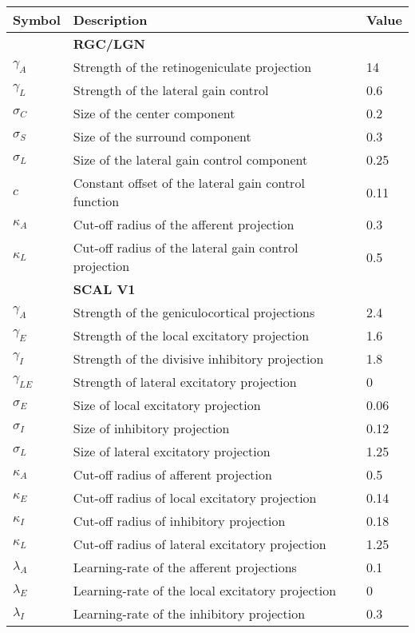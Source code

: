 {\renewcommand{\arraystretch}{0.7}
\begin{tabular}{ l l l }
  \hline
	Symbol & Description & Value \\ \hline
	\ & \textbf{RGC/LGN}  & \  \\
	$\gamma_A$ & Strength of the retinogeniculate projection & 14 \\
	$\gamma_L$ & Strength of the lateral gain control & 0.6 \\
	$\sigma_C$ & Size of the center component & 0.2 \\
	$\sigma_S$ & Size of the surround component & 0.3 \\
	$\sigma_L$ & Size of the lateral gain control component & 0.25 \\
	$c$ & Constant offset of the lateral gain control function & 0.11 \\
	$\kappa_A$ & Cut-off radius of the afferent projection & 0.3 \\
	$\kappa_L$ & Cut-off radius of the lateral gain control projection & 0.5 \\
	\ & \textbf{SCAL V1}  & \  \\
	$\gamma_A$ & Strength of the geniculocortical projections & 2.4 \\
	$\gamma_E$ & Strength of the local excitatory projection & 1.6 \\
	$\gamma_I$ & Strength of the divisive inhibitory projection & 1.8 \\
	$\gamma_{LE}$ & Strength of lateral excitatory projection & 0 \\
	$\sigma_E$ & Size of local excitatory projection & 0.06 \\
	$\sigma_I$ & Size of inhibitory projection & 0.12 \\
	$\sigma_L$ & Size of lateral excitatory projection & 1.25 \\
	$\kappa_A$ & Cut-off radius of afferent projection & 0.5 \\
	$\kappa_E$ & Cut-off radius of local excitatory projection & 0.14 \\
	$\kappa_I$ & Cut-off radius of inhibitory projection & 0.18 \\
	$\kappa_L$ & Cut-off radius of lateral excitatory projection & 1.25 \\
	$\lambda_A$ & Learning-rate of the afferent projections & 0.1 \\
	$\lambda_E$ & Learning-rate of the local excitatory projection & 0 \\
	$\lambda_I$ & Learning-rate of the inhibitory projection & 0.3 \\

\end{tabular}}
